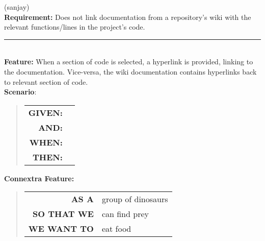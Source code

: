 \documentclass[12pt]{article}
\newcommand{\Requirement}[1] {
   \noindent \textbf{Requirement:} #1
}
\newcommand{\Feature}[1]{ 
   \noindent \textbf{Feature:} #1
}
\newcommand{\CFeature}[4]{
\noindent \textbf{Connextra Feature:}
	\begin{quote}
	\begin{tabular}{rl}
	\textbf{AS A} & #1\\
	\textbf{SO THAT \uppercase{#2}} & #3\\
	\textbf{\uppercase{#2} WANT TO} & #4  
	\end{tabular}
	\end{quote}
}
\newcommand{\GivenSc} {
	\noindent \textbf{GIVEN:}
	}
\newcommand{\WhenSc} {
	\noindent \textbf{WHEN:}
	}
\newcommand{\AndSc} {
	\noindent \textbf{AND:}
	}
\newcommand{\ThenSc} {
	\noindent \textbf{THEN:}
	}
\begin{document}
\pagebreak
\begin{framed}
(sanjay)\\
\Requirement{Does not link documentation from a repository's wiki with the relevant functions/lines in the project's code.}\\[0.2cm]

\hrule~\\

\noindent \Feature{When a section of code is selected, a hyperlink is provided, linking to the documentation. Vice-versa, the wiki documentation contains hyperlinks back to relevant section of code.}\\[0.2cm]

\noindent \textbf{Scenario}:
\begin{quote}
\begin{tabular}{rl}
\GivenSc & \\
\AndSc & \\
\WhenSc &\\
\ThenSc & 
\end{tabular}
\end{quote}

\noindent \CFeature{group of dinosaurs}{we}{can find prey}{eat food}
\end{framed}
\end{document}
